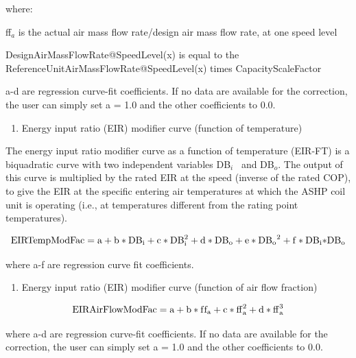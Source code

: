 where:

ff\(_{a}\) is the actual air mass flow rate/design air mass flow rate, at one speed level

DesignAirMassFlowRate@SpeedLevel(x) is equal to the ReferenceUnitAirMassFlowRate@SpeedLevel(x) times CapacityScaleFactor

a-d are regression curve-fit coefficients.  If no data are available for the correction, the user can simply set a = 1.0 and the other coefficients to 0.0.

\begin{enumerate}
\def\labelenumi{\arabic{enumi})}
\setcounter{enumi}{2}
\tightlist
\item
  Energy input ratio (EIR) modifier curve (function of temperature)
\end{enumerate}

The energy input ratio modifier curve as a function of temperature (EIR-FT) is a biquadratic curve with two independent variables DB\(_{i}\)~ and DB\(_{o}\). The output of this curve is multiplied by the rated EIR at the speed (inverse of the rated COP), to give the EIR at the specific entering air temperatures at which the ASHP coil unit is operating (i.e., at temperatures different from the rating point temperatures).

\begin{equation}
{\rm{EIRTempModFac}} = {\rm{a}} + {\rm{b*D}}{{\rm{B}}_{\rm{i}}} + {\rm{c*DB}}_{\rm{i}}^2 + {\rm{d*D}}{{\rm{B}}_{\rm{o}}} + {\rm{e*D}}{{\rm{B}}_{\rm{o}}}^2 + {\rm{f*D}}{{\rm{B}}_{\rm{i}}}{\rm{*D}}{{\rm{B}}_{\rm{o}}}
\end{equation}

where a-f are regression curve fit coefficients.

\begin{enumerate}
\def\labelenumi{\arabic{enumi})}
\setcounter{enumi}{3}
\tightlist
\item
  Energy input ratio (EIR) modifier curve (function of air flow fraction)
\end{enumerate}

\begin{equation}
{\rm{EIRAirFlowModFac}} = {\rm{a}} + {\rm{b*f}}{{\rm{f}}_{\rm{a}}} + {\rm{c*ff}}_{\rm{a}}^2 + {\rm{d*ff}}_{\rm{a}}^3
\end{equation}

where a-d are regression curve-fit coefficients.  If no data are available for the correction, the user can simply set a = 1.0 and the other coefficients to 0.0.

